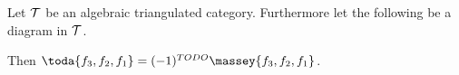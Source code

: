 \begin{corollary}
    Let \( {\mathcal{T}} \) be an algebraic triangulated category. Furthermore let the following be a diagram in \( {\mathcal{T}} \).
    \begin{center}
    \end{center}
    Then \( \toda{f_3, f_2, f_1} = (-1)^{TODO} \massey{f_3, f_2, f_1} \).
\end{corollary}
